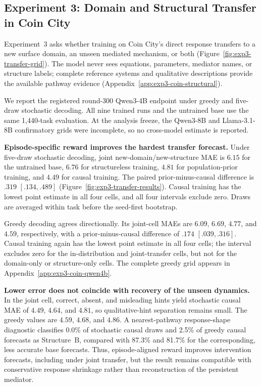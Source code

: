 \subsection{Experiment 3: Domain and Structural Transfer in Coin City}
\label{sec:exp3}

Experiment~3 asks whether training on Coin City's direct response transfers to a
new surface domain, an unseen mediated mechanism, or both
(Figure~\ref{fig:exp3-transfer-grid}). The model never sees equations, parameters,
mediator names, or structure labels; complete reference systems and qualitative
descriptions provide the available pathway evidence
(Appendix~\ref{app:exp3-coin-structural}).

We report the registered round-300 Qwen3-4B endpoint under greedy and five-draw
stochastic decoding. All nine trained runs and the untrained base use the same
1,440-task evaluation. At the analysis freeze, the Qwen3-8B and Llama-3.1-8B
confirmatory grids were incomplete, so no cross-model estimate is reported.



\textbf{Episode-specific reward improves the hardest transfer forecast.}
Under five-draw stochastic decoding, joint new-domain/new-structure MAE is $6.15$
for the untrained base, $6.76$ for structureless training, $4.81$ for
population-prior training, and $4.49$ for causal training. The paired
prior-minus-causal difference is $.319$ $[.134,.489]$
(Figure~\ref{fig:exp3-transfer-results}). Causal training has the lowest point
estimate in all four cells, and all four intervals exclude zero. Draws are
averaged within task before the seed-first bootstrap.

Greedy decoding agrees directionally. Its joint-cell MAEs are $6.09$, $6.69$,
$4.77$, and $4.59$, respectively, with a prior-minus-causal difference of $.174$
$[.039,.316]$. Causal training again has the lowest point estimate in all four
cells; the interval excludes zero for the in-distribution and joint-transfer
cells, but not for the domain-only or structure-only cells. The complete greedy
grid appears in Appendix~\ref{app:exp3-coin-qwen4b}.

\textbf{Lower error does not coincide with recovery of the unseen dynamics.}
In the joint cell, correct, absent, and misleading hints yield stochastic
causal MAE of $4.49$, $4.64$, and $4.81$, so qualitative-hint separation remains
small. The greedy values are $4.59$, $4.68$, and $4.86$. A nearest-pathway
response-shape diagnostic classifies 0.0\% of stochastic causal draws and 2.5\%
of greedy causal forecasts as Structure~B, compared with 87.3\% and 81.7\% for
the corresponding, less accurate base forecasts. Thus,
episode-aligned reward improves intervention forecasts, including under joint
transfer, but the result remains compatible with conservative response shrinkage
rather than reconstruction of the persistent mediator.

